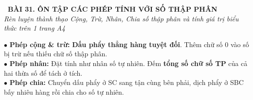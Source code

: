 \documentclass[14pt,a4paper,oneside]{extbook}
\begin{document}
\noindent
\begin{tcolorbox}[
  enhanced,
  colback=teal!8!white,
  colframe=teal!80!black,
  arc=3mm,
  boxrule=1.1pt,
  width=\linewidth,
  halign=center,
  top=2.2mm, bottom=2.2mm,
  left=3mm, right=3mm,
  drop fuzzy shadow
]
  {\large\bfseries\color{teal!95!black}\faBookmark\ BÀI 31. ÔN TẬP CÁC PHÉP TÍNH VỚI SỐ THẬP PHÂN}\\[2pt]
  {\scriptsize\color{black!75}\itshape Rèn luyện thành thạo Cộng, Trừ, Nhân, Chia số thập phân và tính giá trị biểu thức trên 1 trang A4}
\end{tcolorbox}

\vspace{3.2mm}
\noindent
\begin{tcolorbox}[
  enhanced,
  title={\footnotesize\bfseries\color{white}\faCalculator\ 1. Điểm cốt tử của từng phép tính số thập phân},
  colback=blue!2!white,
  colframe=blue!75!black,
  arc=2.5mm, boxrule=0.8pt, top=1.8mm, bottom=1.8mm, left=2.5mm, right=2.5mm
]
  \footnotesize
  $\bullet$ \textbf{Phép cộng \& trừ:} \textbf{Dấu phẩy thẳng hàng tuyệt đối}. Thêm chữ số $0$ vào số bị trừ nếu thiếu chữ số thập phân.\\
  $\bullet$ \textbf{Phép nhân:} Đặt tính như nhân số tự nhiên. Đếm \textbf{tổng số chữ số TP} của cả hai thừa số để tách ở tích.\\
  $\bullet$ \textbf{Phép chia:} Chuyển dấu phẩy ở SC sang tận cùng bên phải, dịch phẩy ở SBC bấy nhiêu hàng rồi chia cho số tự nhiên.
\end{tcolorbox}

\vspace{3mm}
\end{document}
